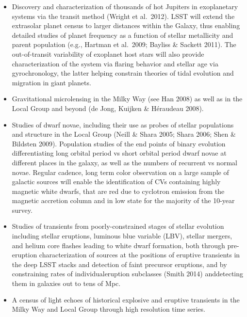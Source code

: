 \begin{itemize}


\item Discovery and characterization of thousands of hot Jupiters
  in exoplanetary systems via the transit method (Wright et al.~2012).
LSST will extend the extrasolar planet census to larger distances within the Galaxy, thus enabling detailed studies
of planet frequency as a function of stellar metallicity and parent population (e.g., Hartman et al.~2009; Bayliss \&
Sackett 2011). The out-of-transit variability of exoplanet host stars will also provide characterization of the system
via flaring behavior and stellar age via gyrochronology, the latter helping constrain theories of tidal evolution and
migration in giant planets.

\item Gravitational microlensing in the Milky Way (see Han 2008) as well as in the Local Group and beyond (de Jong, Kuijken \& H\'{e}raudeau 2008).

\item Studies of dwarf novae, including their use as probes of stellar populations and
      structure in the Local Group (Neill \& Shara 2005; Shara 2006; Shen \& Bildsten 2009). Population studies of the end points of binary evolution differentiating long orbital period vs short orbital period dwarf novae at different places in the galaxy, as well as the numbers of recurrent vs normal novae. Regular cadence, long term color observation on a large sample of galactic sources will enable the identification of CVs containing highly magnetic white dwarfs, that are red due to cyclotron emission from the magnetic accretion column and in low state for the majority of the 10-year survey.

\item Studies of  transients from poorly-constrained stages of stellar evolution including
stellar eruptions,  luminous blue variable (LBV), stellar mergers, and helium core flashes leading to white dwarf formation,  both through pre-eruption characterization of sources at the positions of eruptive transients in the ​deep LSST ​stacks​ and detection of faint precursor eruptions, and by constraining rates of individual ​eruption ​subclasses​ (Smith 2014)​​ anddetecting them in galaxies out to tens of Mpc.

\item A census of light echoes of historical explosive and eruptive
  transients in the Milky Way and Local Group through high resolution
  time series​.


\end{itemize}
